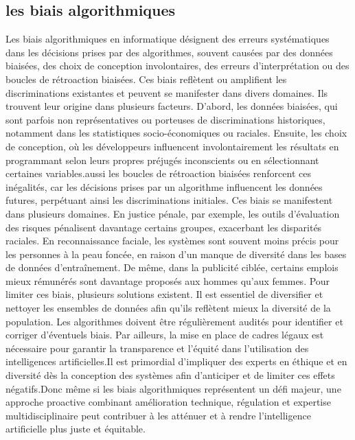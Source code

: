 \documentclass{article}
\begin{document}
\subsection{les biais algorithmiques} 
Les biais algorithmiques en informatique désignent des erreurs systématiques dans les décisions prises par des algorithmes, souvent causées par des données biaisées, des choix de conception involontaires, des erreurs d’interprétation ou des boucles de rétroaction biaisées. Ces biais reflètent ou amplifient les discriminations existantes et peuvent se manifester dans divers domaines. Ils trouvent leur origine dans plusieurs facteurs. D'abord, les données biaisées, qui sont parfois non représentatives ou porteuses de discriminations historiques, notamment dans les statistiques socio-économiques ou raciales. Ensuite, les choix de conception, où les développeurs influencent involontairement les résultats en programmant selon leurs propres préjugés inconscients ou en sélectionnant certaines variables.aussi les boucles de rétroaction biaisées renforcent ces inégalités, car les décisions prises par un algorithme influencent les données futures, perpétuant ainsi les discriminations initiales. Ces biais se manifestent dans plusieurs domaines. En justice pénale, par exemple, les outils d’évaluation des risques pénalisent davantage certains groupes, exacerbant les disparités raciales. En reconnaissance faciale, les systèmes sont souvent moins précis pour les personnes à la peau foncée, en raison d’un manque de diversité dans les bases de données d'entraînement. De même, dans la publicité ciblée, certains emplois mieux rémunérés sont davantage proposés aux hommes qu’aux femmes. Pour limiter ces biais, plusieurs solutions existent. Il est essentiel de diversifier et nettoyer les ensembles de données afin qu’ils reflètent mieux la diversité de la population. Les algorithmes doivent être régulièrement audités pour identifier et corriger d’éventuels biais. Par ailleurs, la mise en place de cadres légaux est nécessaire pour garantir la transparence et l’équité dans l’utilisation des intelligences artificielles.Il est primordial d’impliquer des experts en éthique et en diversité dès la conception des systèmes afin d’anticiper et de limiter ces effets négatifs.Donc même si les biais algorithmiques représentent un défi majeur, une approche proactive combinant amélioration technique, régulation et expertise multidisciplinaire peut contribuer à les atténuer et à rendre l’intelligence artificielle plus juste et équitable.
\end{document}
